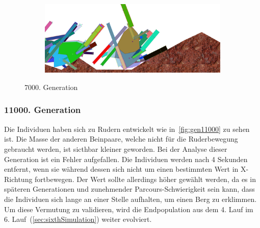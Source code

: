 \begin{figure}[H]
\begin{subfigure}[b]{0.45\textwidth}
            \includegraphics[width=\linewidth,center]{graphics/simulation-results/4_gen7000_4}
            \caption{\label{fig:gen7000_4}}
          \end{subfigure}
          \caption{7000. Generation\label{fig:gen7000}}
        \end{figure}

      \subsubsection{11000. Generation}

        Die Individuen haben sich zu Rudern entwickelt wie in~\vref{fig:gen11000} zu sehen ist.
        Die Masse der anderen Beinpaare, welche nicht für die Ruderbewegung gebraucht werden,
        ist sicthbar kleiner geworden.
        Bei der Analyse dieser Generation ist ein Fehler aufgefallen.
        Die Individuen werden nach 4 Sekunden entfernt,
        wenn sie während dessen sich nicht um einen bestimmten Wert in X-Richtung fortbewegen.
        Der Wert sollte allerdings höher gewählt werden,
        da es in späteren Generationen und zunehmender Parcours-Schwierigkeit sein kann,
        dass die Individuen sich lange an einer Stelle aufhalten, um einen Berg zu erklimmen.
        Um diese Vermutung zu validieren,
        wird die Endpopulation aus dem 4. Lauf im 6. Lauf~(\vref{sec:sixthSimulation}) weiter evolviert.


